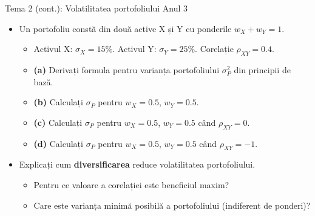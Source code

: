 \documentclass[9pt, aspectratio=169, t]{beamer}
\theoremstyle{definition}
\begin{document}
\begin{frame}{Tema 2 (cont.): Volatilitatea portofoliului \hfill {\small\textcolor{Forest}{Anul 3}}}
\begin{itemize}
    \item Un portofoliu constă din două active X și Y cu ponderile $w_X + w_Y = 1$.
    \begin{itemize}
        \item Activul X: $\sigma_X = 15\%$. \quad Activul Y: $\sigma_Y = 25\%$. \quad Corelație $\rho_{XY} = 0.4$.
        \item \textbf{(a)} Derivați formula pentru varianța portofoliului $\sigma_P^2$ din principii de bază.
        \item \textbf{(b)} Calculați $\sigma_P$ pentru $w_X = 0.5$, $w_Y = 0.5$.
        \item \textbf{(c)} Calculați $\sigma_P$ pentru $w_X = 0.5$, $w_Y = 0.5$ când $\rho_{XY} = 0$.
        \item \textbf{(d)} Calculați $\sigma_P$ pentru $w_X = 0.5$, $w_Y = 0.5$ când $\rho_{XY} = -1$.
    \end{itemize}
    \item Explicați cum \textbf{diversificarea} reduce volatilitatea portofoliului.
    \begin{itemize}
        \item Pentru ce valoare a corelației este beneficiul maxim?
        \item Care este varianța minimă posibilă a portofoliului (indiferent de ponderi)?
    \end{itemize}
\end{itemize}
\end{frame}
\end{document}
